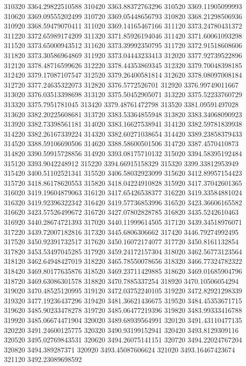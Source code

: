 {310320 3364.29822510588
310420 3363.88372763296
310520 3369.11905099993
310620 3369.09555202499
310720 3369.05448656793
310820 3368.21298506936
310920 3368.59479070411
311020 3369.14165467166
311120 3373.24780431372
311220 3372.65989174209
311320 3371.85926194046
311420 3371.60061093298
311520 3373.65000943512
311620 3373.39992350795
311720 3372.91518608606
311820 3373.30586964869
311920 3373.04443233413
312020 3377.92739522896
312120 3378.48716599626
312220 3378.44353869345
312320 3379.70048398185
312420 3379.17087107547
312520 3379.26400581814
312620 3378.08097008184
312720 3377.24635322073
312820 3376.5772526701
312920 3376.99749011667
313020 3376.03513398698
313120 3375.50452905071
313220 3375.52233760729
313320 3375.7951781045
313420 3379.48761472798
313520 3381.09591497028
313620 3382.20225608681
313720 3383.53364855948
313820 3383.34068090923
313920 3382.73398561181
314020 3383.16627538941
314120 3382.59781839938
314220 3382.26167339224
314320 3382.60271038654
314420 3389.23858379433
314520 3388.59106690506
314620 3388.58600501506
314720 3387.4570410873
314820 3390.59915728856
314920 3393.08175710132
315020 3394.58395192484
315120 3393.9042248912
315220 3394.66915158329
315320 3399.33812953949
315420 3400.51102521341
315520 3406.58032923099
315620 3412.89957154423
315720 3418.86178620553
315820 3418.04224910828
315920 3417.37042601365
316020 3419.19604879063
316120 3417.65426538377
316220 3419.33584881024
316320 3419.92396322342
316420 3419.57736853996
316520 3423.36606165582
316620 3423.57526499672
316720 3427.07802828785
316820 3435.5242610463
316920 3440.28674721393
317020 3440.11999614505
317120 3439.34518976071
317220 3439.72007182816
317320 3445.6806306662
317420 3446.79274992495
317520 3450.92391732517
317620 3450.16072174077
317720 3450.8161132854
317820 3453.53497045285
317920 3459.24172157304
318020 3462.56773123564
318120 3462.64948427019
318220 3465.78550078656
318320 3466.77324782322
318420 3469.80177635876
318520 3469.23711429885
318620 3469.01685904796
318720 3469.63086301578
318820 3470.7885337254
318920 3470.10506054294
319020 3470.48525120995
319120 3472.03752240105
319220 3472.82921298339
319320 3477.19236437296
319420 3481.36621436675
319520 3484.45353671715
319620 3485.90233478278
319720 3485.06477219396
319820 3483.99333416788
319920 3485.06674471904
320020 3489.68939564991
320120 3491.43110477135
320220 3491.24600125775
320320 3490.93199152941
320420 3493.8129309116
320520 3495.02769843531
320620 3494.26075141151
320720 3494.22024767204
320820 3494.389287371
320920 3493.45087606624
321020 3493.16467423674
321120 3492.23089698592
}
